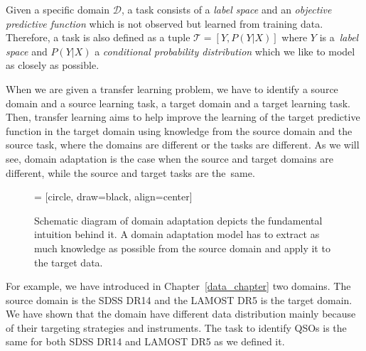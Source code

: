 Given a specific domain \(\mathcal{D}\),
a task consists of a \textit{label space} and an \textit{objective predictive function}
which is not observed but learned from training data.
Therefore, a task is also defined as a tuple \(\mathcal{T} = [Y, P(Y | X)]\)
where \(Y\) is a~\textit{label space}
and \(P(Y | X)\) a \textit{conditional probability distribution}
which we like to model as closely as possible.

When we are given a transfer learning problem,
we have to identify a source domain and a source learning task,
a target domain and a target learning task.
Then, transfer learning aims to help improve the learning of the target predictive function in the target domain
using knowledge from the source domain and the source task,
where the domains are different or the tasks are different.
As we will see, domain adaptation is the case
when the source and target domains are different,
while the source and target tasks are the~same.~\cite{pan2010}

\begin{figure}
\begin{center}
 = [circle, draw=black, align=center]
\end{center}
\caption[Schematic depiction of domain adaptation]{
	Schematic diagram of domain adaptation depicts the fundamental intuition behind it.
	A domain adaptation model has to extract as much knowledge as possible from the source domain
	and apply it to the target data.
	}
\end{figure}

For example, we have introduced in Chapter~\ref{data_chapter}
two domains.
The source domain is the SDSS DR14 and the LAMOST DR5 is the target domain.
We have shown that the domain have different data distribution
mainly because of their targeting strategies and instruments.
The task to identify QSOs is the same for both SDSS DR14 and LAMOST DR5
as we defined it.


